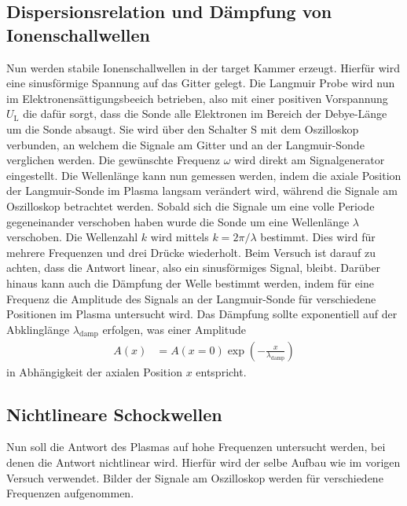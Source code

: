 \subsection{Dispersionsrelation und D\"ampfung von Ionenschallwellen}
Nun werden stabile Ionenschallwellen in der target Kammer erzeugt.
Hierf\"ur wird eine sinusf\"ormige Spannung auf das Gitter gelegt.
Die Langmuir Probe wird nun im Elektronens\"attigungsbeeich betrieben, also mit einer positiven Vorspannung $U_\text{L}$ die daf\"ur sorgt, dass die Sonde alle Elektronen im Bereich der Debye-L\"ange um die Sonde absaugt.
Sie wird \"uber den Schalter S mit dem Oszilloskop verbunden, an welchem die Signale am Gitter und an der Langmuir-Sonde verglichen werden.
Die gew\"unschte Frequenz $\omega$ wird direkt am Signalgenerator eingestellt.
Die Wellenl\"ange kann nun gemessen werden, indem die axiale Position der Langmuir-Sonde im Plasma langsam ver\"andert wird, w\"ahrend die Signale am Oszilloskop betrachtet werden.
Sobald sich die Signale um eine volle Periode gegeneinander verschoben haben wurde die Sonde um eine Wellenl\"ange $\lambda$ verschoben.
Die Wellenzahl $k$ wird mittels $k=2\pi/\lambda$ bestimmt.
Dies wird f\"ur mehrere Frequenzen und drei Dr\"ucke wiederholt.
Beim Versuch ist darauf zu achten, dass die Antwort linear, also ein sinusf\"ormiges Signal, bleibt.
Dar\"uber hinaus kann auch die D\"ampfung der Welle bestimmt werden, indem f\"ur eine Frequenz die Amplitude des Signals an der Langmuir-Sonde f\"ur verschiedene Positionen im Plasma untersucht wird.
Das D\"ampfung sollte exponentiell auf der Abklingl\"ange $\lambda_\text{damp}$ erfolgen, was einer Amplitude
\begin{align}
A(x)
    &=A(x=0)\exp(-\frac{x}{\lambda_\text{damp}})
    \label{eq:A}
\end{align}
in Abh\"angigkeit der axialen Position $x$ entspricht.

\subsection{Nichtlineare Schockwellen}
Nun soll die Antwort des Plasmas auf hohe Frequenzen untersucht werden, bei denen die Antwort nichtlinear wird.
Hierf\"ur wird der selbe Aufbau wie im vorigen Versuch verwendet.
Bilder der Signale am Oszilloskop werden f\"ur verschiedene Frequenzen aufgenommen.
\cite{anleitung2}
\FloatBarrier
